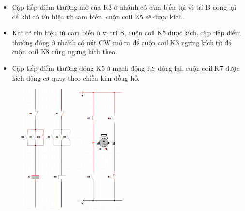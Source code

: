 \begin{itemize}
    \item Cặp tiếp điểm thường mở của K3 ở nhánh có cảm biến tại vị trí B đóng lại để khi có tín hiệu từ cảm biến, cuộn coil K5 sẽ được kích.
\end{itemize}
\begin{figure}[H]
    \centering
\end{figure}
\begin{itemize}
    \item Khi có tín hiệu từ cảm biến ở vị trí B, cuộn coil K5 được kích, cặp tiếp điểm thường đóng ở nhánh có nút CW mở ra để cuộn coil K3 ngưng kích từ đó cuộn coil K8 cũng ngưng kích theo.
    \item Cặp tiếp điểm thường đóng K5 ở mạch động lực đóng lại, cuộn coil K7 được kích động cơ quay theo chiều kim đồng hồ.
\end{itemize}
\begin{figure}[H]
    \centering
    \includegraphics[width=0.5\textwidth]{pictures/kichK5.png}
\end{figure}
